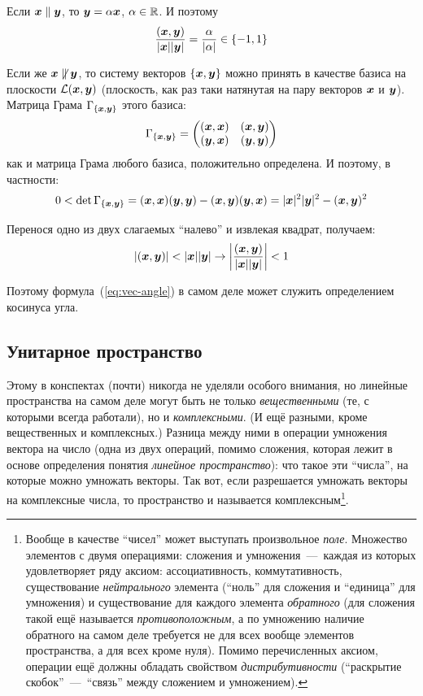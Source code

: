 \documentclass[a4paper,12pt]{article}
\begin{document}
  Если $\bds x \hm\parallel \bds y$, то $\bds y \hm= \alpha \bds x$, $\alpha \hm\in \RR$.
  И поэтому
  \[
    \frac{(\boldsymbol x, \boldsymbol y)}{|\boldsymbol x| |\boldsymbol y|} = \frac{\alpha}{|\alpha|} \in \{-1, 1\}
  \]
  
  Если же $\bds x \hm{\not\parallel} \bds y$, то систему векторов $\{\boldsymbol x, \boldsymbol y\}$ можно принять в качестве базиса на плоскости $\mathcal L(\boldsymbol x, \boldsymbol y)$ (плоскость, как раз таки натянутая на пару векторов $\boldsymbol x$ и $\boldsymbol y$).
  Матрица Грама $\Gamma_{\{\boldsymbol x, \boldsymbol y\}}$ этого базиса:
  \[
    \Gamma_{\{\boldsymbol x, \boldsymbol y\}} = \begin{pmatrix}
      (\boldsymbol x, \boldsymbol x) & (\boldsymbol x, \boldsymbol y)\\
      (\boldsymbol y, \boldsymbol x) & (\boldsymbol y, \boldsymbol y)
    \end{pmatrix}
  \]
  как и матрица Грама любого базиса, положительно определена.
  И поэтому, в частности:
  \[
    0 < \det \Gamma_{\{\boldsymbol x, \boldsymbol y\}} = (\boldsymbol x, \boldsymbol x) (\boldsymbol y, \boldsymbol y) - (\boldsymbol x, \boldsymbol y) (\boldsymbol y, \boldsymbol x)
    = |\boldsymbol x|^2 |\boldsymbol y|^2 - (\boldsymbol x, \boldsymbol y)^2
  \]
  
  Перенося одно из двух слагаемых ``налево'' и извлекая квадрат, получаем:
  \[
    |(\boldsymbol x, \boldsymbol y)| < |\boldsymbol x| |\boldsymbol y|
    \rightarrow \left|\frac{(\boldsymbol x, \boldsymbol y)}{|\boldsymbol x| |\boldsymbol y|}\right| < 1
  \]
  
  Поэтому формула~(\ref{eq:vec-angle}) в самом деле может служить определением косинуса угла.
  
  
  \subsection{Унитарное пространство}
  
  Этому в конспектах (почти) никогда не уделяли особого внимания, но линейные пространства на самом деле могут быть не только \emph{вещественными} (те, с которыми всегда работали), но и \emph{комплексными}.
  (И ещё разными, кроме вещественных и комплексных.)
  Разница между ними в операции умножения вектора на число (одна из двух операций, помимо сложения, которая лежит в основе определения понятия \emph{линейное пространство}): что такое эти ``числа'', на которые можно умножать векторы.
  Так вот, если разрешается умножать векторы на комплексные числа, то пространство и называется комплексным\footnote{Вообще в качестве ``чисел'' может выступать произвольное \emph{поле}. Множество элементов с двумя операциями: сложения и умножения~---~каждая из которых удовлетворяет ряду аксиом: ассоциативность, коммутативность, существование \emph{нейтрального} элемента (``ноль'' для сложения и ``единица'' для умножения) и существование для каждого элемента \emph{обратного} (для сложения такой ещё называется \emph{противоположным}, а по умножению наличие обратного на самом деле требуется не для всех вообще элементов пространства, а для всех кроме нуля). Помимо перечисленных аксиом, операции ещё должны обладать свойством \emph{дистрибутивности} (``раскрытие скобок''~---~``связь'' между сложением и умножением).}.
  
\end{document}
